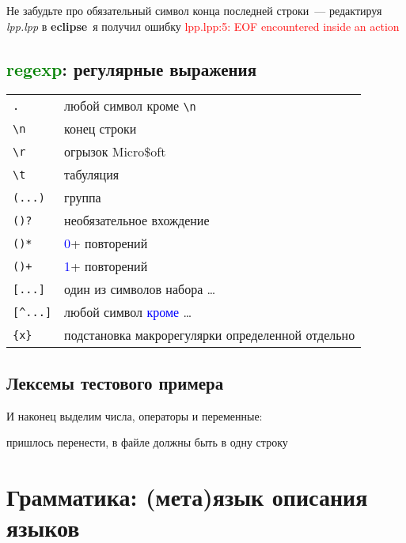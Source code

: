 \documentclass[oneside,10pt]{article}
\renewcommand{\emph}[1]{\textcolor{blue}{#1}}
\newcommand{\term}[1]{\textcolor{green}{#1}}
\newcommand{\error}[1]{\textcolor{red}{#1}}
\newcommand{\prog}[1]{\textbf{#1}}
\newcommand{\file}[1]{\textit{#1}}
\newcommand{\eclipse}{\prog{eclipse}}
\newcommand{\lst}[2]{}
\begin{document}
\noindent
Не забудьте про обязательный символ конца последней строки\ --- редактируя
\file{lpp.lpp} в \eclipse\ я получил ошибку \error{lpp.lpp:5: EOF encountered
inside an action}

\lst{\file{lpp.lpp}: удаление лишнего}{doc/02.lpp}
\lst{\file{log.log}: остались только значащие символы}{doc/02.llg}

\subsection{\term{regexp}: регулярные выражения}

\begin{tabular}{l l}
\verb|.| & любой символ кроме \verb|\n| \\
\verb|\n| & конец строки \\
\verb|\r| & огрызок Micro\$oft \\
\verb|\t| & табуляция \\
\verb|(...)| & группа \\
\verb|()?| & необязательное вхождение \\
\verb|()*| & \emph{0}+ повторений \\
\verb|()+| & \emph{1}+ повторений \\
\verb|[...]| & один из символов набора \ldots \\
\verb|[^...]| & любой символ \emph{кроме} \ldots \\
\verb|{x}| & подстановка макрорегулярки определенной отдельно \\
\end{tabular}

\subsection{Лексемы тестового примера}

И наконец выделим числа, операторы и переменные:

\lst{\file{lpp.lpp}: полный набор \term{regexp}ов}{doc/03.lpp}
\lst{\file{lpp.lpp}: числа (несколько вариантов)}{doc/04.lpp}
пришлось перенести, в файле должны быть в одну строку
\lst{\file{log.log}: числа}{doc/04.llg}
\clearpage
\lst{\file{lpp.lpp}: имена и операторы}{doc/05.lpp}
\clearpage
\lst{\file{log.log}: имена и операторы}{doc/05.llg}

\clearpage
\section{Грамматика: (мета)язык описания языков}
\end{document}
